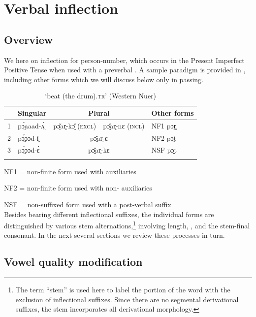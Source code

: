 \documentclass[output=paper
,newtxmath
,modfonts
,nonflat]{langsci/langscibook}
\begin{document}
\section{Verbal inflection}
\subsection{Overview} %

We  here on inflection for  person-number, which occurs in the Present Imperfect Positive Tense when used with a preverbal .  A sample paradigm is provided in , including other forms which we will discuss below only in passing.

\begin{table}
\begin{tabularx}{\textwidth}{llrll}
\lsptoprule
 & \bfseries Singular & \multicolumn{2}{c}{\bfseries Plural} & \bfseries Other forms\\
\midrule
1  & pɔ̤́aaad-ʌ̤̀ & \multicolumn{1}{r}{pɔ̤̌ar̥-kɔ̤̌ (\textsc{excl})} & \multicolumn{1}{l}{pɔ̤̌ar̥-nɛ (\textsc{incl})} & NF1 pɔ̤r̥\\
2 & pɔ̤́ɔɔd-ì̤ & \multicolumn{2}{c}{pɔ̤̌ar̥-ɛ} & NF2 pɔ̤t\\
3 & pɔ̤́ɔɔd-ɛ̀ & \multicolumn{2}{c}{pɔ̤̌ar̥-kɛ} & NSF pɔ̤t\\
\lspbottomrule
\end{tabularx}
\caption{‘beat (the drum)\textsc{.tr}’ (Western Nuer)}
\label{tab:monich:3}
\end{table}

NF1 = non-finite form used with  auxiliaries

NF2 = non-finite form used with non- auxiliaries

NSF = non-suffixed form used with a post-verbal suffix\\ 

Besides bearing different inflectional suffixes, the individual forms are distinguished by various stem alternations,\footnote{The term “stem” is used here to label the portion of the word with the exclusion of inflectional suffixes.  Since there are no segmental derivational suffixes, the stem incorporates all derivational morphology.} involving length, ,  and the stem-final consonant.  In the next several sections we review these processes in turn. 

\subsection{Vowel quality modification} %
\end{document}

